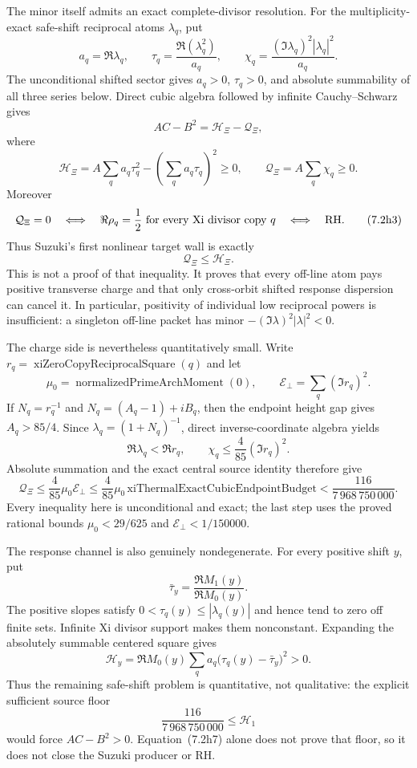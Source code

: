 \documentclass[11pt]{article}
\theoremstyle{definition}
\theoremstyle{remark}
\begin{document}
The minor itself admits an exact complete-divisor resolution.  For the multiplicity-exact
safe-shift reciprocal atoms $\lambda_q$, put
\[
 a_q=\Re\lambda_q,\qquad
 \tau_q=\frac{\Re(\lambda_q^2)}{a_q},\qquad
 \chi_q=\frac{(\Im\lambda_q)^2|\lambda_q|^2}{a_q}.
\]
The unconditional shifted sector gives $a_q>0$, $\tau_q>0$, and absolute summability of all
three series below.  Direct cubic algebra followed by infinite Cauchy--Schwarz gives
\[
 AC-B^2=\mathcal H_\Xi-\mathcal Q_\Xi,                  \tag{7.2h1}
\]
where
\[
 \mathcal H_\Xi
 =A\sum_q a_q\tau_q^2-\left(\sum_q a_q\tau_q\right)^2\geq0,
 \qquad
 \mathcal Q_\Xi=A\sum_q\chi_q\geq0.                    \tag{7.2h2}
\]
Moreover
\[
 \mathcal Q_\Xi=0\quad\Longleftrightarrow\quad
 \Re\rho_q=\frac12\ \hbox{for every Xi divisor copy }q
 \quad\Longleftrightarrow\quad \mathrm{RH}.             \tag{7.2h3}
\]
Thus Suzuki's first nonlinear target wall is exactly
\[
                     \mathcal Q_\Xi\leq\mathcal H_\Xi.  \tag{7.2h4}
\]
This is not a proof of that inequality.  It proves that every off-line atom pays positive
transverse charge and that only cross-orbit shifted response dispersion can cancel it.  In
particular, positivity of individual low reciprocal powers is insufficient: a singleton
off-line packet has minor $-(\Im\lambda)^2|\lambda|^2<0$.

The charge side is nevertheless quantitatively small.  Write
$r_q=\operatorname{xiZeroCopyReciprocalSquare}(q)$ and let
\[
 \mu_0=\operatorname{normalizedPrimeArchMoment}(0),
 \qquad
 \mathcal E_\perp=\sum_q(\Im r_q)^2.
\]
If $N_q=r_q^{-1}$ and $N_q=(A_q-1)+iB_q$, then the endpoint height gap gives
$A_q>85/4$.  Since $\lambda_q=(1+N_q)^{-1}$, direct inverse-coordinate algebra yields
\[
 \Re\lambda_q<\Re r_q,\qquad
 \chi_q\leq\frac4{85}(\Im r_q)^2.                       \tag{7.2h5}
\]
Absolute summation and the exact central source identity therefore give
\[
 \mathcal Q_\Xi
 \leq\frac4{85}\mu_0\mathcal E_\perp
 \leq\frac4{85}\mu_0\,
       \mathrm{xiThermalExactCubicEndpointBudget}
 <\frac{116}{7\,968\,750\,000}.                         \tag{7.2h6}
\]
Every inequality here is unconditional and exact; the last step uses the proved rational bounds
$\mu_0<29/625$ and $\mathcal E_\perp<1/150000$.

The response channel is also genuinely nondegenerate.  For every positive shift $y$, put
\[
 \bar\tau_y=\frac{\Re M_1(y)}{\Re M_0(y)}.
\]
The positive slopes satisfy $0<\tau_q(y)\leq|\lambda_q(y)|$ and hence tend to zero off finite
sets.  Infinite Xi divisor support makes them nonconstant.  Expanding the absolutely summable
centered square gives
\[
 \mathcal H_y
 =\Re M_0(y)\sum_q a_q\bigl(\tau_q(y)-\bar\tau_y\bigr)^2
 >0.                                                    \tag{7.2h7}
\]
Thus the remaining safe-shift problem is quantitative, not qualitative: the explicit sufficient
source floor
\[
 \frac{116}{7\,968\,750\,000}\leq\mathcal H_1
\]
would force $AC-B^2>0$.  Equation~(7.2h7) alone does not prove that floor, so it does not close
the Suzuki producer or RH.
\end{document}
